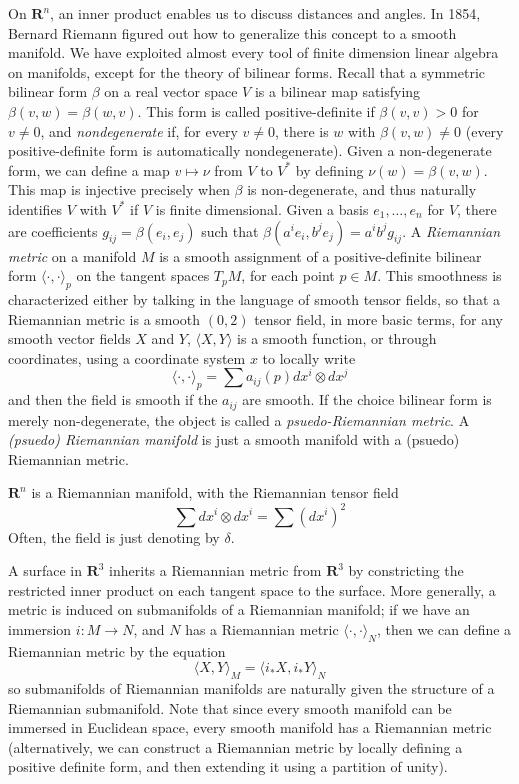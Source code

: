On $\mathbf{R}^n$, an inner product enables us to discuss distances and angles. In 1854, Bernard Riemann figured out how to generalize this concept to a smooth manifold. We have exploited almost every tool of finite dimension linear algebra on manifolds, except for the theory of bilinear forms. Recall that a symmetric bilinear form $\beta$ on a real vector space $V$ is a bilinear map satisfying $\beta(v,w) = \beta(w,v)$. This form is called positive-definite if $\beta(v,v) > 0$ for $v \neq 0$, and {\it nondegenerate} if, for every $v \neq 0$, there is $w$ with $\beta(v,w) \neq 0$ (every positive-definite form is automatically nondegenerate). Given a non-degenerate form, we can define a map $v \mapsto \nu$ from $V$ to $V^*$ by defining $\nu(w) = \beta(v,w)$. This map is injective precisely when $\beta$ is non-degenerate, and thus naturally identifies $V$ with $V^*$ if $V$ is finite dimensional. Given a basis $e_1, \dots, e_n$ for $V$, there are coefficients $g_{ij} = \beta(e_i,e_j)$ such that $\beta(a^ie_i, b^je_j) = a^i b^j g_{ij}$. A \emph{Riemannian metric} on a manifold $M$ is a smooth assignment of a positive-definite bilinear form $\langle \cdot, \cdot \rangle_p$ on the tangent spaces $T_p M$, for each point $p \in M$. This smoothness is characterized either by talking in the language of smooth tensor fields, so that a Riemannian metric is a smooth $(0,2)$ tensor field, in more basic terms, for any smooth vector fields $X$ and $Y$, $\langle X, Y \rangle$ is a smooth function, or through coordinates, using a coordinate system $x$ to locally write
%
\[ \langle \cdot, \cdot \rangle_p = \sum a_{ij}(p) dx^i \otimes dx^j \]
%
and then the field is smooth if the $a_{ij}$ are smooth. If the choice bilinear form is merely non-degenerate, the object is called a \emph{psuedo-Riemannian metric}. A \emph{(psuedo) Riemannian manifold} is just a smooth manifold with a (psuedo) Riemannian metric.

\begin{example}
    $\mathbf{R}^n$ is a Riemannian manifold, with the Riemannian tensor field
    \[ \sum dx^i \otimes dx^i = \sum (dx^i)^2 \]
    Often, the field is just denoting by $\delta$.
\end{example}

\begin{example}
    A surface in $\mathbf{R}^3$ inherits a Riemannian metric from $\mathbf{R}^3$ by constricting the restricted inner product on each tangent space to the surface. More generally, a metric is induced on submanifolds of a Riemannian manifold; if we have an immersion $i: M \to N$, and $N$ has a Riemannian metric $\langle \cdot, \cdot \rangle_N$, then we can define a Riemannian metric by the equation
    \[ \langle X, Y \rangle_M = \langle i_*X, i_*Y \rangle_N \]
    so submanifolds of Riemannian manifolds are naturally given the structure of a Riemannian submanifold. Note that since every smooth manifold can be immersed in Euclidean space, every smooth manifold has a Riemannian metric (alternatively, we can construct a Riemannian metric by locally defining a positive definite form, and then extending it using a partition of unity).
\end{example}


